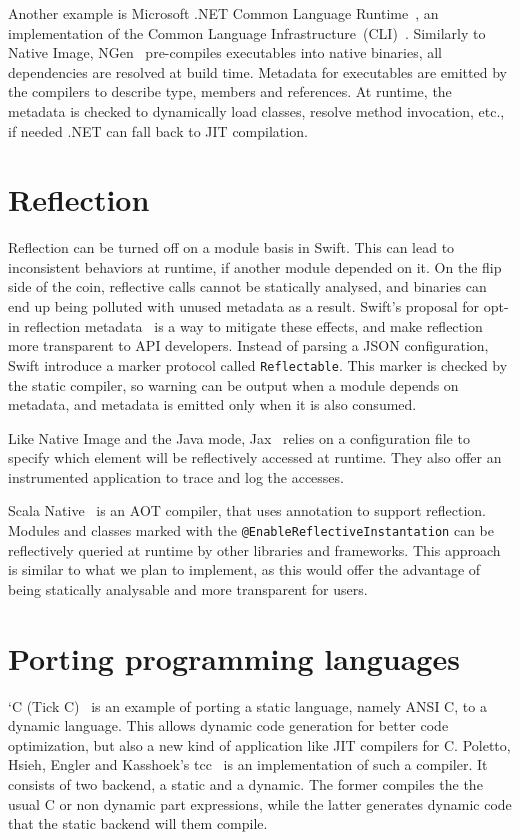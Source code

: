 Another example is Microsoft .NET Common Language Runtime~\cite{noauthor_common_2023}, an implementation of the Common Language Infrastructure~(CLI)~\cite{noauthor_common_2012}. 
Similarly to Native Image, NGen~\cite{noauthor_clr_2019} pre-compiles executables 
into native binaries, all dependencies are resolved at build time.
Metadata for executables are emitted by the compilers to describe type, members and references. At runtime, the metadata is checked to dynamically load classes, resolve method invocation, etc., if needed .NET can fall back to JIT compilation.

\section{Reflection}
Reflection can be turned off on a module basis in Swift. This can lead to inconsistent behaviors at runtime, 
if another module depended on it. On the flip side of the coin, reflective calls cannot be statically analysed, and binaries can end up being polluted with unused metadata as a result.
Swift's proposal for opt-in reflection metadata~\cite{noauthor_pitch_2022} is a way to mitigate these effects, and make reflection more transparent to API developers.
Instead of parsing a JSON configuration, Swift introduce a marker protocol called \verb|Reflectable|. This marker is checked by the static compiler, so warning can be output when a module depends on metadata, and metadata is emitted only when it is also consumed.

Like Native Image and the Java mode, Jax~\cite{tip_practical_1999} relies on a configuration file to specify which element will be reflectively accessed at runtime. They also offer an instrumented application to trace and log the accesses.


Scala Native~\cite{noauthor_scala_nodate} is an AOT compiler, that uses annotation to support reflection. Modules and classes marked with the \verb|@EnableReflectiveInstantation| can be reflectively queried at runtime by other libraries and frameworks.
This approach is similar to what we plan to implement, as this would offer the advantage of being statically analysable and more transparent for users.



\section{Porting programming languages}
`C (Tick C)~\cite{engler_c_1996} is an example of porting a static language, namely ANSI C, to a dynamic language. This allows dynamic code generation for better code optimization, 
but also a new kind of application like JIT compilers for C.
Poletto, Hsieh, Engler and Kasshoek's tcc~\cite{poletto_c_1999} is an implementation of such a compiler. It consists of two backend, a static and a dynamic.
The former compiles the the usual C or non dynamic part expressions, while the latter generates dynamic code that the static backend will them compile.

